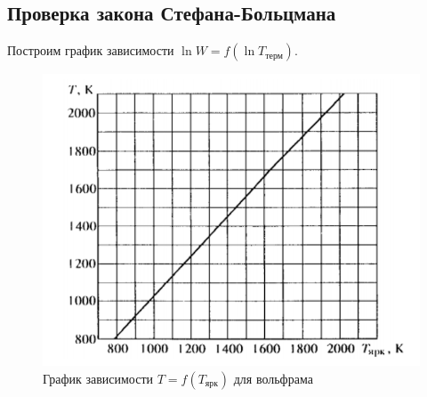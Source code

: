 \documentclass[a4paper,12pt]{article}
\begin{document}
\subsection*{Проверка закона Стефана-Больцмана}
Построим график зависимости $\ln W = f(\ln T_\text{терм})$.

\begin{figure}[H]
    \centering
    \includegraphics[scale=0.5]{graphik.png}
    \caption{График зависимости $T=f(T_\text{ярк})$ для вольфрама}
\end{figure}
\end{document}
